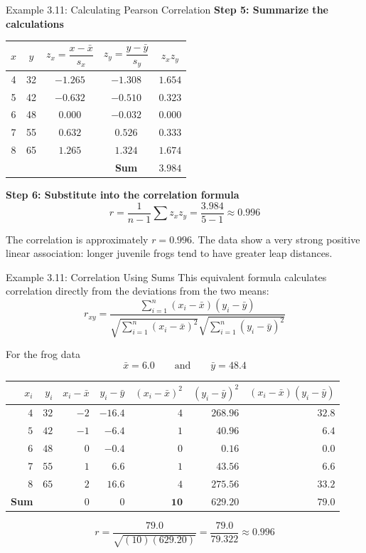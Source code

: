\documentclass[aspectratio=169]{beamer}
\begin{document}
\begin{frame}{Example 3.11: Calculating Pearson Correlation}
\scriptsize
\textbf{Step 5: Summarize the calculations}
\begin{center}
\begin{tabular}{ccccc}
\toprule
$x$ & $y$ & $z_x=\dfrac{x-\bar{x}}{s_x}$ &
$z_y=\dfrac{y-\bar{y}}{s_y}$ & $z_xz_y$ \\
\midrule
4 & 32 & $-1.265$ & $-1.308$ & $1.654$ \\
5 & 42 & $-0.632$ & $-0.510$ & $0.323$ \\
6 & 48 & $0.000$  & $-0.032$ & $0.000$ \\
7 & 55 & $0.632$  & $0.526$  & $0.333$ \\
8 & 65 & $1.265$  & $1.324$  & $1.674$ \\
\midrule
 & & & \textbf{Sum} & $\mathbf{3.984}$ \\
\bottomrule
\end{tabular}
\end{center}

\textbf{Step 6: Substitute into the correlation formula}
\[
	r = \frac{1}{n-1} \sum z_xz_y = \frac{3.984}{5-1} \approx 0.996
\]

The correlation is approximately $r=0.996$. The data show a very strong positive linear association: longer juvenile frogs tend to have greater leap distances.
\end{frame}

\begin{frame}{Example 3.11: Correlation Using Sums}
\scriptsize
This equivalent formula calculates correlation directly from the deviations from the two means:
\[
	r_{xy} =\frac{\displaystyle\sum_{i=1}^{n}(x_i-\bar{x})(y_i-\bar{y})}{\sqrt{\displaystyle\sum_{i=1}^{n}(x_i-\bar{x})^2}\sqrt{\displaystyle\sum_{i=1}^{n}(y_i-\bar{y})^2}}
\]

For the frog data
\[
	\bar{x}=6.0 \qquad\text{and}\qquad \bar{y}=48.4
\]
\begin{center}
\setlength{\tabcolsep}{4.5pt}
\renewcommand{\arraystretch}{1.08}
\begin{tabular}{rrrrrrr}
\toprule
$x_i$ & $y_i$
& $x_i-\bar{x}$
& $y_i-\bar{y}$
& $(x_i-\bar{x})^2$
& $(y_i-\bar{y})^2$
& $(x_i-\bar{x})(y_i-\bar{y})$ \\
\midrule
$4$ & $32$ & $-2$ & $-16.4$ & $4$ & $268.96$ & $32.8$ \\
$5$ & $42$ & $-1$ & $-6.4$  & $1$ & $40.96$  & $6.4$ \\
$6$ & $48$ & $0$  & $-0.4$  & $0$ & $0.16$   & $0.0$ \\
$7$ & $55$ & $1$  & $6.6$   & $1$ & $43.56$  & $6.6$ \\
$8$ & $65$ & $2$  & $16.6$  & $4$ & $275.56$ & $33.2$ \\
\midrule
\textbf{Sum} & & $0$ & $0$
& $\mathbf{10}$
& $\mathbf{629.20}$
& $\mathbf{79.0}$ \\
\bottomrule
\end{tabular}
\end{center}
\[
r = \frac{79.0}{\sqrt{(10)(629.20)}} = \frac{79.0}{79.322} \approx 0.996
\]

\end{frame}
\end{document}
